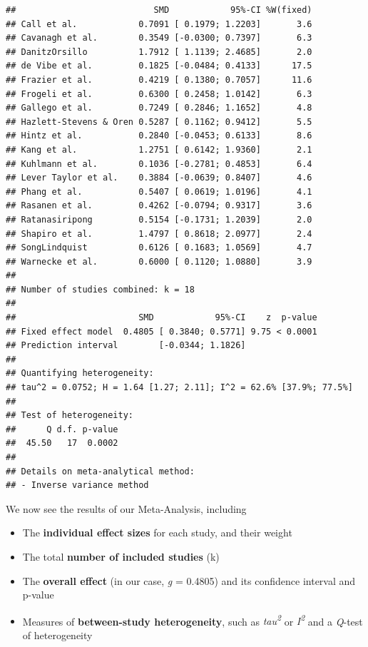 \documentclass[]{book}
\providecommand{\tightlist}{%
  \setlength{\itemsep}{0pt}\setlength{\parskip}{0pt}}
\begin{document}
\begin{verbatim}
##                           SMD            95%-CI %W(fixed)
## Call et al.            0.7091 [ 0.1979; 1.2203]       3.6
## Cavanagh et al.        0.3549 [-0.0300; 0.7397]       6.3
## DanitzOrsillo          1.7912 [ 1.1139; 2.4685]       2.0
## de Vibe et al.         0.1825 [-0.0484; 0.4133]      17.5
## Frazier et al.         0.4219 [ 0.1380; 0.7057]      11.6
## Frogeli et al.         0.6300 [ 0.2458; 1.0142]       6.3
## Gallego et al.         0.7249 [ 0.2846; 1.1652]       4.8
## Hazlett-Stevens & Oren 0.5287 [ 0.1162; 0.9412]       5.5
## Hintz et al.           0.2840 [-0.0453; 0.6133]       8.6
## Kang et al.            1.2751 [ 0.6142; 1.9360]       2.1
## Kuhlmann et al.        0.1036 [-0.2781; 0.4853]       6.4
## Lever Taylor et al.    0.3884 [-0.0639; 0.8407]       4.6
## Phang et al.           0.5407 [ 0.0619; 1.0196]       4.1
## Rasanen et al.         0.4262 [-0.0794; 0.9317]       3.6
## Ratanasiripong         0.5154 [-0.1731; 1.2039]       2.0
## Shapiro et al.         1.4797 [ 0.8618; 2.0977]       2.4
## SongLindquist          0.6126 [ 0.1683; 1.0569]       4.7
## Warnecke et al.        0.6000 [ 0.1120; 1.0880]       3.9
## 
## Number of studies combined: k = 18
## 
##                        SMD            95%-CI    z  p-value
## Fixed effect model  0.4805 [ 0.3840; 0.5771] 9.75 < 0.0001
## Prediction interval        [-0.0344; 1.1826]              
## 
## Quantifying heterogeneity:
## tau^2 = 0.0752; H = 1.64 [1.27; 2.11]; I^2 = 62.6% [37.9%; 77.5%]
## 
## Test of heterogeneity:
##      Q d.f. p-value
##  45.50   17  0.0002
## 
## Details on meta-analytical method:
## - Inverse variance method
\end{verbatim}

We now see the results of our Meta-Analysis, including

\begin{itemize}
\tightlist
\item
  The \textbf{individual effect sizes} for each study, and their weight
\item
  The total \textbf{number of included studies} (k)
\item
  The \textbf{overall effect} (in our case, \emph{g} = 0.4805) and its confidence interval and p-value
\item
  Measures of \textbf{between-study heterogeneity}, such as \emph{tau\textsuperscript{2}} or \emph{I\textsuperscript{2}} and a \emph{Q}-test of heterogeneity
\end{itemize}
\end{document}

